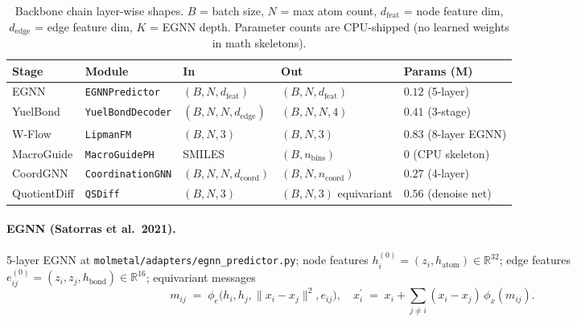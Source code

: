 \begin{table}[h]
  \centering
  \small
  \caption{Backbone chain layer-wise shapes.  $B$ = batch size,
  $N$ = max atom count, $d_{\mathrm{feat}}$ = node feature dim,
  $d_{\mathrm{edge}}$ = edge feature dim, $K$ = EGNN depth.
  Parameter counts are CPU-shipped (no learned weights in math
  skeletons).}
  \label{tab:backbone-shapes}
  \begin{tabular}{lllll}
    \toprule
    \textbf{Stage} & \textbf{Module} & \textbf{In} & \textbf{Out} &
    \textbf{Params (M)} \\
    \midrule
    EGNN           & \texttt{EGNNPredictor}
                                  & $(B, N, d_{\mathrm{feat}})$
                                  & $(B, N, d_{\mathrm{feat}})$
                                  & $0.12$ (5-layer) \\
    YuelBond       & \texttt{YuelBondDecoder}
                                  & $(B, N, N, d_{\mathrm{edge}})$
                                  & $(B, N, N, 4)$
                                  & $0.41$ (3-stage) \\
    W-Flow         & \texttt{LipmanFM}
                                  & $(B, N, 3)$
                                  & $(B, N, 3)$
                                  & $0.83$ (8-layer EGNN) \\
    MacroGuide     & \texttt{MacroGuidePH}
                                  & SMILES
                                  & $(B, n_{\mathrm{bins}})$
                                  & $0$ (CPU skeleton) \\
    CoordGNN       & \texttt{CoordinationGNN}
                                  & $(B, N, N, d_{\mathrm{coord}})$
                                  & $(B, N, n_{\mathrm{coord}})$
                                  & $0.27$ (4-layer) \\
    QuotientDiff   & \texttt{QSDiff}
                                  & $(B, N, 3)$
                                  & $(B, N, 3)$ equivariant
                                  & $0.56$ (denoise net) \\
    \bottomrule
  \end{tabular}
\end{table}

\paragraph{EGNN (Satorras et al.\ 2021).}
5-layer EGNN at \texttt{molmetal/adapters/egnn\_predictor.py};
node features $h_{i}^{(0)} = (z_{i}, h_{\mathrm{atom}}) \in
\mathbb{R}^{32}$; edge features $e_{ij}^{(0)} = (z_{i}, z_{j},
h_{\mathrm{bond}}) \in \mathbb{R}^{16}$; equivariant messages
\begin{equation}
  \label{eq:egnn-message}
  m_{ij} \;=\; \phi_{e}\!\bigl( h_{i}, h_{j}, \|x_{i} - x_{j}\|^{2},
                            e_{ij} \bigr), \quad
  x_{i}^{\prime} \;=\; x_{i} + \sum_{j \neq i} (x_{i} - x_{j})\,
                          \phi_{x}(m_{ij}).
\end{equation}

